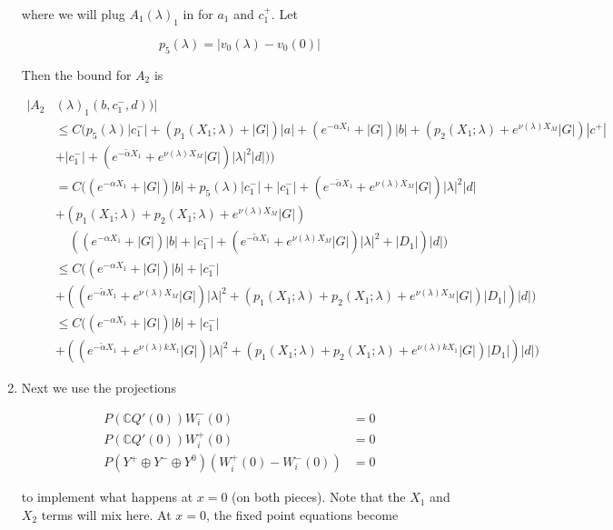 \documentclass[12pt]{article}
\def\C{{\mathbb C}}
\begin{document}
\begin{enumerate}
where we will plug $A_1(\lambda)_1$ in for $a_1$ and $c_1^+$. Let 

\[
p_5(\lambda) = |v_0(\lambda) - v_0(0)| 
\]

Then the bound for $A_2$ is

\begin{align*}
|A_2&(\lambda)_1(b, c_1^-, d))| \\
&\leq C( p_5(\lambda) |c_1^-| + (p_1(X_1; \lambda) + |G|)|a| + (e^{-\alpha X_1} + |G|) |b| + ( p_2(X_1; \lambda) + e^{\nu(\lambda)X_M} |G|) |c^+| \\
&+ |c_1^-| + (e^{-\tilde{\alpha} X_1} + e^{\nu(\lambda)X_M} |G|) |\lambda|^2 |d| ) ) \\
&= C( (e^{-\alpha X_1} + |G|) |b| + p_5(\lambda) |c_1^-| + |c_1^-| + (e^{-\tilde{\alpha} X_1} + e^{\nu(\lambda)X_M} |G|) |\lambda|^2 |d| \\
&+ (p_1(X_1; \lambda) + p_2(X_1; \lambda) + e^{\nu(\lambda)X_M} |G|) \\
&\:\:\:\:\:( ( e^{-\alpha X_1} + |G|) |b| + |c_1^-| + (e^{-\tilde{\alpha} X_1} + e^{\nu(\lambda)X_M} |G|) |\lambda|^2 + |D_1|) |d| )\\
&\leq C( (e^{-\alpha X_1} + |G|) |b| + |c_1^-| \\
&+ ((e^{-\tilde{\alpha} X_1} + e^{\nu(\lambda)X_M} |G|) |\lambda|^2 + (p_1(X_1; \lambda) + p_2(X_1; \lambda) + e^{\nu(\lambda)X_M} |G|)|D_1|)|d| )\\
&\leq C( (e^{-\alpha X_1} + |G|) |b| + |c_1^-| \\
&+ ((e^{-\tilde{\alpha} X_1} + e^{\nu(\lambda)k X_1} |G|) |\lambda|^2 + (p_1(X_1; \lambda) + p_2(X_1; \lambda) + e^{\nu(\lambda) k X_1} |G|)|D_1|)|d| )
\end{align*}

\item Next we use the projections 

\begin{align*}
P(\C Q'(0))W_i^-(0) &= 0 \\
P(\C Q'(0))W_i^+(0) &= 0 \\
P(Y^+ \oplus Y^- \oplus Y^0) ( W_i^+(0) - W_i^-(0) ) &= 0
\end{align*}

to implement what happens at $x = 0$ (on both pieces). Note that the $X_1$ and $X_2$ terms will mix here. At $x = 0$, the fixed point equations become


\end{enumerate}
\end{document}
